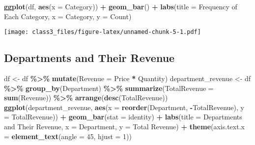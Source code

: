 \documentclass[
]{article}
\newenvironment{Shaded}{\begin{snugshade}}{\end{snugshade}}
\newcommand{\AttributeTok}[1]{\textcolor[rgb]{0.13,0.29,0.53}{#1}}
\newcommand{\DecValTok}[1]{\textcolor[rgb]{0.00,0.00,0.81}{#1}}
\newcommand{\FunctionTok}[1]{\textcolor[rgb]{0.13,0.29,0.53}{\textbf{#1}}}
\newcommand{\NormalTok}[1]{#1}
\newcommand{\OtherTok}[1]{\textcolor[rgb]{0.56,0.35,0.01}{#1}}
\newcommand{\SpecialCharTok}[1]{\textcolor[rgb]{0.81,0.36,0.00}{\textbf{#1}}}
\newcommand{\StringTok}[1]{\textcolor[rgb]{0.31,0.60,0.02}{#1}}
\begin{document}
\begin{Shaded}
\begin{Highlighting}[]
\FunctionTok{ggplot}\NormalTok{(df, }\FunctionTok{aes}\NormalTok{(}\AttributeTok{x =}\NormalTok{ Category)) }\SpecialCharTok{+}
  \FunctionTok{geom\_bar}\NormalTok{() }\SpecialCharTok{+}
  \FunctionTok{labs}\NormalTok{(}\AttributeTok{title =} \StringTok{\textquotesingle{}Frequency of Each Category\textquotesingle{}}\NormalTok{, }\AttributeTok{x =} \StringTok{\textquotesingle{}Category\textquotesingle{}}\NormalTok{, }\AttributeTok{y =} \StringTok{\textquotesingle{}Count\textquotesingle{}}\NormalTok{)}
\end{Highlighting}
\end{Shaded}

\texttt{[image: class3\_files/figure-latex/unnamed-chunk-5-1.pdf]}

\subsection{Departments and Their
Revenue}\label{departments-and-their-revenue}

\begin{Shaded}
\begin{Highlighting}[]
\NormalTok{df }\OtherTok{\textless{}{-}}\NormalTok{ df }\SpecialCharTok{\%\textgreater{}\%}
  \FunctionTok{mutate}\NormalTok{(}\AttributeTok{Revenue =}\NormalTok{ Price }\SpecialCharTok{*}\NormalTok{ Quantity)}
\NormalTok{department\_revenue }\OtherTok{\textless{}{-}}\NormalTok{ df }\SpecialCharTok{\%\textgreater{}\%}
  \FunctionTok{group\_by}\NormalTok{(Department) }\SpecialCharTok{\%\textgreater{}\%}
  \FunctionTok{summarize}\NormalTok{(}\AttributeTok{TotalRevenue =} \FunctionTok{sum}\NormalTok{(Revenue)) }\SpecialCharTok{\%\textgreater{}\%}
  \FunctionTok{arrange}\NormalTok{(}\FunctionTok{desc}\NormalTok{(TotalRevenue))}
\FunctionTok{ggplot}\NormalTok{(department\_revenue, }\FunctionTok{aes}\NormalTok{(}\AttributeTok{x =} \FunctionTok{reorder}\NormalTok{(Department, }\SpecialCharTok{{-}}\NormalTok{TotalRevenue), }\AttributeTok{y =}\NormalTok{ TotalRevenue)) }\SpecialCharTok{+}
  \FunctionTok{geom\_bar}\NormalTok{(}\AttributeTok{stat =} \StringTok{\textquotesingle{}identity\textquotesingle{}}\NormalTok{) }\SpecialCharTok{+}
  \FunctionTok{labs}\NormalTok{(}\AttributeTok{title =} \StringTok{\textquotesingle{}Departments and Their Revenue\textquotesingle{}}\NormalTok{, }\AttributeTok{x =} \StringTok{\textquotesingle{}Department\textquotesingle{}}\NormalTok{, }\AttributeTok{y =} \StringTok{\textquotesingle{}Total Revenue\textquotesingle{}}\NormalTok{) }\SpecialCharTok{+}
  \FunctionTok{theme}\NormalTok{(}\AttributeTok{axis.text.x =} \FunctionTok{element\_text}\NormalTok{(}\AttributeTok{angle =} \DecValTok{45}\NormalTok{, }\AttributeTok{hjust =} \DecValTok{1}\NormalTok{))}
\end{Highlighting}
\end{Shaded}
\end{document}
